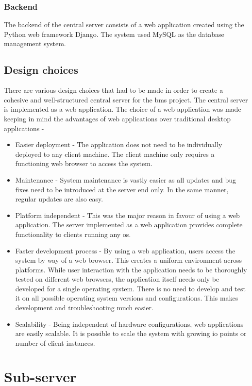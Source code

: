 \documentclass[letterpaper,11pt]{report}
\begin{document}
\subsubsection{Backend}
The backend of the central server consists of a web application created using the Python web framework Django. The system used MySQL as the database management system.
\subsection{Design choices}
There are various design choices that had to be made in order to create a cohesive and well-structured central server for the \ac{bms} project. The central server is implemented as a web application. The choice of a web-application was made keeping in mind the advantages of web applications over traditional desktop applications -
\begin{itemize}
    \item Easier deployment - The application does not need to be individually deployed to any client machine. The client machine only requires a functioning web browser to access the system.
    \item Maintenance - System maintenance is vastly easier as all updates and bug fixes need to be introduced at the server end only. In the same manner, regular updates are also easy.
    \item Platform independent - This was the major reason in favour of using a web application. The server implemented as a web application provides complete functionality to clients running any \ac{os}.
    \item Faster development process - By using a web application, users access the system by way of a web browser. This creates a uniform environment across platforms. While user interaction with the application needs to be thoroughly tested on different web browsers, the application itself needs only be developed for a single operating system. There is no need to develop and test it on all possible operating system versions and configurations. This makes development and troubleshooting much easier.
    \item Scalability - Being independent of hardware configurations, web applications are easily scalable. It is possible to scale the system with growing \ac{io} points or number of client instances.
\end{itemize}
\section{Sub-server}
\end{document}
